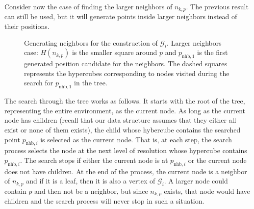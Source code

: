 \documentclass[letterpaper, 10 pt, conference]{ieeeconf}
\theoremstyle{definition}
\begin{document}
Consider now the case of finding the larger neighbors of $n_{k,p}$. The previous result can still be used, but it will generate points inside larger neighbors instead of their positions.
\begin{figure}[ht]
\centering
	
\newcommand{\drawChildren}[2]{\draw[treenodes] #1 rectangle ($#1+(#2,#2)$);
\draw[treenodes] #1 rectangle ($#1+(-#2,#2)$);
\draw[treenodes] #1 rectangle ($#1+(-#2,-#2)$);
\draw[treenodes] #1 rectangle ($#1+(#2,-#2)$);}

 	\caption{Generating neighbors for the construction of $\mathcal{G}_i$. Larger neighbors case: $H(n_{k,p})$ is the smaller square  around $p$ and $p_{\mathrm{nhb},1}$ is the first generated position candidate for the neighbors. The dashed squares represents the hypercubes corresponding to nodes visited during the search for $p_{\mathrm{nhb},1}$ in the tree.}
	\label{larger}
\end{figure}
The search through the tree works as follows.
It starts with the root of the tree, representing the entire environment, as the current node. As long as the current node has children (recall that our data structure assumes that they either all exist or none of them exists), the child whose hybercube contains the searched point $p_{\mathrm{nhb},i}$ is selected as the current node. That is, at each step, the search process selects the node at the next level of resolution whose hypercube contains $p_{\mathrm{nhb},i}$. The search stops if either the current node is at $p_{\mathrm{nhb},i}$ or the current node does not have children. At the end of the process, the current node is a neighbor of $n_{k,p}$ and if it is a leaf, then it is also a vertex of $\mathcal{G}_i$.
A larger node could contain $p$ and then not be a neighbor, but since $n_{k,p}$ exists, that node would have children and the search process will never stop in such a situation.
\end{document}
